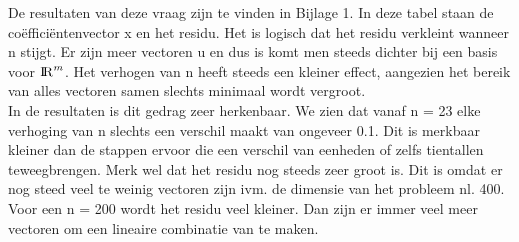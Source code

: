 De resultaten van deze vraag zijn te vinden in Bijlage 1. In deze tabel staan de coëfficiëntenvector x en het residu. Het is logisch dat het residu verkleint wanneer n stijgt. Er zijn meer vectoren u en dus is komt men steeds dichter bij een basis voor ${\rm I\!R}^{m}$. Het verhogen van n heeft steeds een kleiner effect, aangezien het bereik van alles vectoren samen slechts minimaal wordt vergroot. \\

In de resultaten is dit gedrag zeer herkenbaar. We zien dat vanaf n = 23 elke verhoging van n slechts een verschil maakt van ongeveer 0.1. Dit is merkbaar kleiner dan de stappen ervoor die een verschil van eenheden of zelfs tientallen teweegbrengen. Merk wel dat het residu nog steeds zeer groot is. Dit is omdat er nog steed veel te weinig vectoren zijn ivm. de dimensie van het probleem nl. 400. Voor een n = 200 wordt het residu veel kleiner. Dan zijn er immer veel meer vectoren om een lineaire combinatie van te maken.\\
